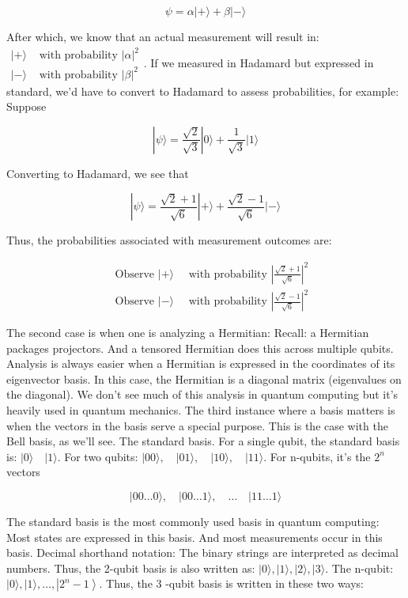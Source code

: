 \documentclass[main.tex]{subfiles}
\begin{document}
    $$
    \psi=\alpha|+\rangle+\beta|-\rangle
    $$
    
    After which, we know that an actual measurement will result in: $\begin{array}{ll}|+\rangle & \text { with probability }|\alpha|^{2} \\ |-\rangle & \text { with probability }|\beta|^{2}\end{array}$. If we measured in Hadamard but expressed in standard, we'd have to convert to Hadamard to assess probabilities, for example: Suppose
    
    $$
    |\psi\rangle=\frac{\sqrt{2}}{\sqrt{3}}|0\rangle+\frac{1}{\sqrt{3}}|1\rangle
    $$
    
    Converting to Hadamard, we see that
    
    $$
    |\psi\rangle=\frac{\sqrt{2}+1}{\sqrt{6}}|+\rangle+\frac{\sqrt{2}-1}{\sqrt{6}}|-\rangle
    $$
    
    Thus, the probabilities associated with measurement outcomes are:
    
    $$
    \begin{aligned}
    &\text { Observe }|+\rangle \quad \text { with probability }\left|\frac{\sqrt{2}+1}{\sqrt{6}}\right|^{2} \\
    &\text { Observe }|-\rangle \quad \text { with probability }\left|\frac{\sqrt{2}-1}{\sqrt{6}}\right|^{2}
    \end{aligned}
    $$
    
    The second case is when one is analyzing a Hermitian: Recall: a Hermitian packages projectors. And a tensored Hermitian does this across multiple qubits. Analysis is always easier when a Hermitian is expressed in the coordinates of its eigenvector basis. In this case, the Hermitian is a diagonal matrix (eigenvalues on the diagonal). We don't see much of this analysis in quantum computing but it's heavily used in quantum mechanics. The third instance where a basis matters is when the vectors in the basis serve a special purpose. This is the case with the Bell basis, as we'll see. The standard basis. For a single qubit, the standard basis is: $|0\rangle \quad|1\rangle$. For two qubits: $|00\rangle, \quad|01\rangle, \quad|10\rangle, \quad|11\rangle$. For $\mathrm{n}$-qubits, it's the $2^{n}$ vectors
    
    $$
    |00 \ldots 0\rangle, \quad|00 \ldots 1\rangle, \quad \ldots \quad|11 \ldots 1\rangle
    $$
    
    The standard basis is the most commonly used basis in quantum computing: Most states are expressed in this basis. And most measurements occur in this basis. Decimal shorthand notation: The binary strings are interpreted as decimal numbers. Thus, the 2-qubit basis is also written as: $|0\rangle,|1\rangle,|2\rangle,|3\rangle$. The n-qubit: $|0\rangle,|1\rangle, \ldots,\left|2^{n}-1\right\rangle$. Thus, the 3 -qubit basis is written in these two ways:
    
\end{document}
